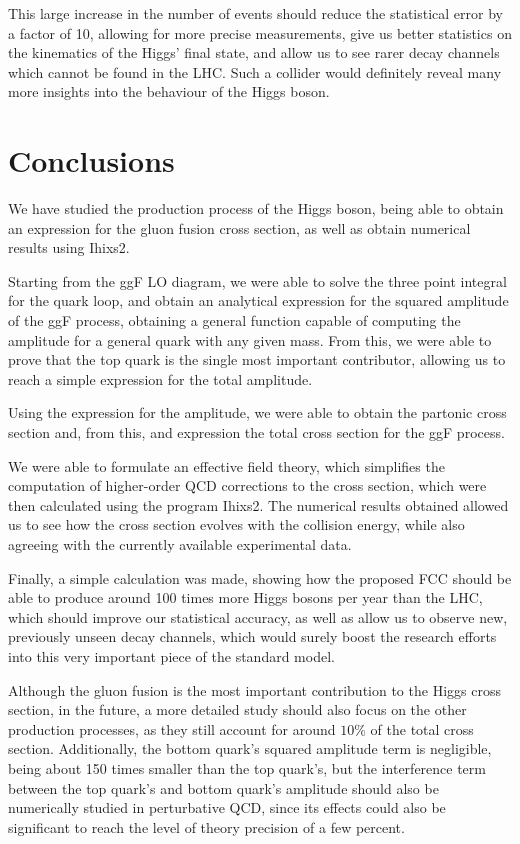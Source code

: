 \documentclass[EPJ,twocolumn]{webofc}
\begin{document}
This large increase in the number of events should reduce the statistical error by a factor of 10, allowing for more precise measurements,  give us better statistics on the kinematics of the Higgs' final state, and allow us to see rarer decay channels which cannot be found in the LHC. Such a collider would definitely reveal many more insights into the behaviour of the Higgs boson.~


\section{\label{sec5}Conclusions}
We have studied the production process of the Higgs boson, being able to obtain an expression for the gluon fusion cross section, as well as obtain numerical results using Ihixs2.

Starting from the ggF LO diagram, we were able to solve the three point integral for the quark loop, and obtain an analytical expression for the squared amplitude of the ggF process, obtaining a general function capable of computing the amplitude for a general quark with any given mass. From this, we were able to prove that the top quark is the single most important contributor, allowing us to reach a simple expression for the total amplitude.

Using the expression for the amplitude, we were able to obtain the partonic cross section and, from this, and expression the total cross section for the ggF process.

We were able to formulate an effective field theory, which simplifies the computation of higher-order QCD corrections to the cross section, which were then calculated using the program Ihixs2\cite{Dulat_2018}.
The numerical results obtained allowed us to see how the cross section evolves with the collision energy, while also agreeing with the currently available experimental data.

Finally, a simple calculation was made, showing how the proposed FCC should be able to produce around 100 times more Higgs bosons per year than the LHC, which should improve our statistical accuracy, as well as allow us to observe new, previously unseen decay channels, which would surely boost the research efforts into this very important piece of the standard model.

Although the gluon fusion is the most important contribution to the Higgs cross section, in the future, a more detailed study should also focus on the other production processes, as they still account for around $10\%$ of the total cross section. Additionally, the bottom quark’s squared amplitude term is negligible, being about 150 times smaller than the top quark’s, but the interference term between the top quark’s and bottom quark’s amplitude should also be numerically studied in perturbative QCD, since its effects could also be significant to reach the level of theory precision of a few percent. 
\end{document}

